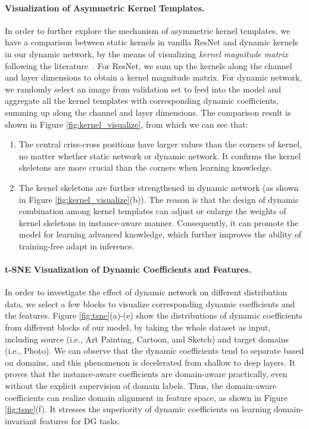 \documentclass{article}
\begin{document}
\paragraph{Visualization of Asymmetric Kernel Templates.}
In order to further explore the mechanism of asymmetric kernel templates, we have a comparison between static kernels in vanilla ResNet and dynamic kernels in our dynamic network, by the means of visualizing \emph{kernel magnitude matrix} following the literature~\cite{ding2019acnet}. For ResNet, we sum up the  kernels along the channel and layer dimensions to obtain a  kernel magnitude matrix. For dynamic network, we randomly select an image from validation set to feed into the model and aggregate all the kernel templates with corresponding dynamic coefficients, summing up along the channel and layer dimensions. The comparison result is shown in Figure \ref{fig:kernel_visualize}, from which we can see that:
\begin{enumerate}[1)]
    \item The central criss-cross positions have larger values than the corners of kernel, no matter whether static network or dynamic network. It confirms the kernel skeletons are more crucial than the corners when learning knowledge.  
    \item The kernel skeletons are further strengthened in dynamic network (as shown in Figure \ref{fig:kernel_visualize}(b)). The reason is that the design of dynamic combination among kernel templates can adjust or enlarge the weights of kernel skeletons in instance-aware manner. Consequently, it can promote the model for learning advanced knowledge, which further improves the ability of training-free adapt in inference.  
\end{enumerate}


\paragraph{t-SNE Visualization of Dynamic Coefficients and Features.}
In order to investigate the effect of dynamic network on different distribution data, we select a few blocks to visualize corresponding dynamic coefficients and the features. Figure \ref{fig:tsne}(a)-(e) show the distributions of dynamic coefficients from different blocks of our model, by taking the whole dataset as input, including source (i.e., Art Painting, Cartoon, and Sketch) and target domains (i.e., Photo). We can observe that the dynamic coefficients tend to separate based on domains, and this phenomenon is decelerated from shallow to deep layers. It proves that the instance-aware coefficients are domain-aware practically, even without the explicit supervision of domain labels. Thus, the domain-aware coefficients can realize domain alignment in feature space, as shown in Figure \ref{fig:tsne}(f). It stresses the superiority of dynamic coefficients on learning domain-invariant features for DG tasks.
\end{document}
